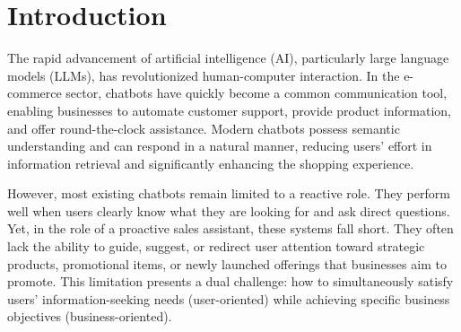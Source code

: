 \documentclass[conference]{IEEEtran}
\begin{document}
\section{Introduction}
The rapid advancement of artificial intelligence (AI), particularly large language models (LLMs), has revolutionized human-computer interaction. In the e-commerce sector, chatbots have quickly become a common communication tool, enabling businesses to automate customer support, provide product information, and offer round-the-clock assistance. Modern chatbots possess semantic understanding and can respond in a natural manner, reducing users' effort in information retrieval and significantly enhancing the shopping experience.




However, most existing chatbots remain limited to a reactive role. They perform well when users clearly know what they are looking for and ask direct questions. Yet, in the role of a proactive sales assistant, these systems fall short. They often lack the ability to guide, suggest, or redirect user attention toward strategic products, promotional items, or newly launched offerings that businesses aim to promote. This limitation presents a dual challenge: how to simultaneously satisfy users' information-seeking needs (user-oriented) while achieving specific business objectives (business-oriented).
\end{document}
